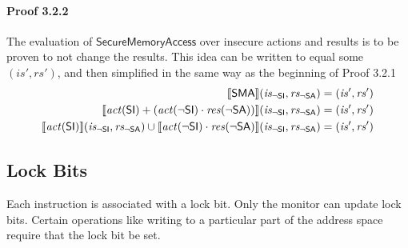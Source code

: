 \documentclass[12pt, letterpaper]{article}
\begin{document}
\paragraph{Proof 3.2.2}
    The evaluation of $\mathsf{SecureMemoryAccess}$ over insecure actions and results is to be proven to not change the results.  This idea can be written to equal some $(\mathit{is}', \mathit{rs}')$, and then simplified in the same way as the beginning of Proof 3.2.1
\begin{align}
    \setcounter{equation}{0}
    \llbracket \mathsf{SMA} \rrbracket (\mathit{is_{\mathsf{\neg SI}}}, \mathit{rs_{\mathsf{\neg SA}}})
    &=
    (\mathit{is}', \mathit{rs}')
    \\
    \llbracket \mathit{act}(\mathsf{SI}) +
    (\mathit{act}(\neg\mathsf{SI}) \cdot
     \mathit{res}(\neg\mathsf{SA}))  \rrbracket (\mathit{is_{\mathsf{\neg SI}}}, \mathit{rs_{\mathsf{\neg SA}}})
    &=
    (\mathit{is}', \mathit{rs}')
    \\
    \llbracket \mathit{act}(\mathsf{SI}) \rrbracket (\mathit{is_{\mathsf{\neg SI}}}, \mathit{rs_{\mathsf{\neg SA}}}) \cup %
    \llbracket \mathit{act}(\neg\mathsf{SI}) \cdot
     \mathit{res}(\neg\mathsf{SA}) \rrbracket (\mathit{is_{\mathsf{\neg SI}}}, \mathit{rs_{\mathsf{\neg SA}}})
    &=
    (\mathit{is}', \mathit{rs}')
\end{align}



\subsection{Lock Bits}

Each instruction is associated with a lock bit.
Only the monitor can update lock bits.
Certain operations like writing to a particular part of the address space
require that the lock bit be set. 


\end{document}
